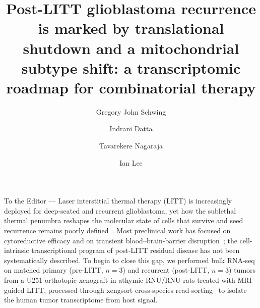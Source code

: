 \documentclass[unnumsec,webpdf,contemporary,large]{oup-authoring-template}
\begin{document}


\title[Post-LITT glioblastoma transcriptomic roadmap]{Post-LITT glioblastoma recurrence is marked by translational shutdown and a mitochondrial subtype shift: a transcriptomic roadmap for combinatorial therapy}

\author[1,$\ast$]{Gregory John Schwing}
\author[2]{Indrani Datta}
\author[2]{Tavarekere Nagaraja}
\author[3]{Ian Lee}

\address[1]{, , }
\address[2]{, , }
\address[3]{, , }


\received{}{}{}
\revised{}{}{}
\accepted{}{}{}

\maketitle


\noindent To the Editor --- Laser interstitial thermal therapy (LITT) is increasingly deployed for deep-seated and recurrent glioblastoma, yet how the sublethal thermal penumbra reshapes the molecular state of cells that survive and seed recurrence remains poorly defined~\cite{LITT_review}. Most preclinical work has focused on cytoreductive efficacy and on transient blood--brain-barrier disruption~\cite{LITT_BBB}; the cell-intrinsic transcriptional program of post-LITT residual disease has not been systematically described. To begin to close this gap, we performed bulk RNA-seq on matched primary (pre-LITT, $n=3$) and recurrent (post-LITT, $n=3$) tumors from a U251 orthotopic xenograft in athymic RNU/RNU rats treated with MRI-guided LITT, processed through xengsort cross-species read-sorting~\cite{xengsort} to isolate the human tumor transcriptome from host signal.
\end{document}
